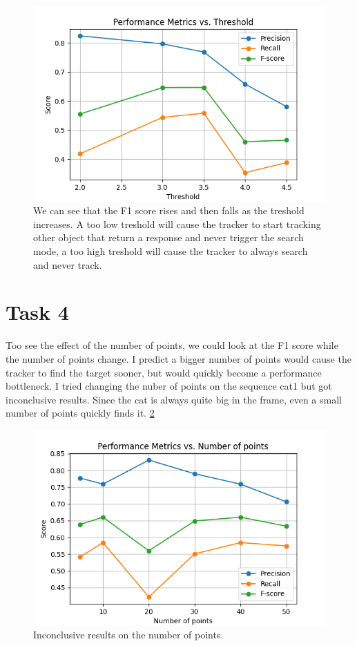 \documentclass[9pt]{IEEEtran}
\begin{document}
\begin{figure}
    \centering
    \includegraphics[width=1\columnwidth]{../figs/figure3.png}
    \caption{We can see that the F1 score rises and then falls as the treshold increases. A too low treshold will cause the tracker to start tracking other object that return a response and never trigger the search mode, a too high treshold will cause the tracker to always search and never track.}
    \label{fig:confidence_score}
\end{figure}

\section{Task 4}
Too see the effect of the number of points, we could look at the F1 score while the number of points change. I predict a bigger number of points would cause the tracker to find the target sooner, but would quickly become a performance bottleneck. I tried changing the nuber of points on the sequence cat1 but got inconclusive results. Since the cat is always quite big in the frame, even a small number of points quickly finds it. \ref{fig:incinclusive}

\begin{figure}
    \centering
    \includegraphics[width=1\columnwidth]{../figs/figure4.png}
    \caption{Inconclusive results on the number of points.}
    \label{fig:incinclusive}
\end{figure}
\end{document}
